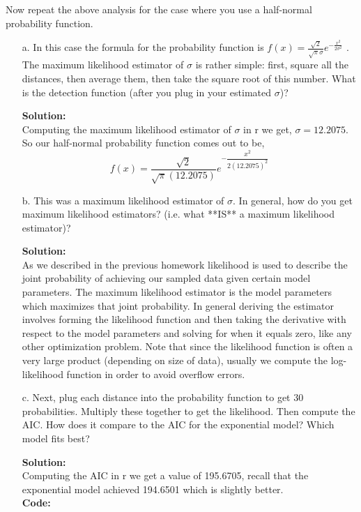 \documentclass[12pt]{article}
\makeatletter
\theoremstyle{homework}
\newenvironment{exercise}[1]
{\def\@currentlabel{#1}\exercisecore}
{\endexercisecore}
\newcommand{\localhead}[1]{\par\smallskip\noindent\textbf{#1}\nobreak\\}%
\newcommand\solution{\localhead{Solution:}}
\makeatother
\begin{document}
\begin{exercise}{2} Now repeat the above analysis for the case where you use a half-normal probability
  function.\\

  \begin{enumerate}
    \item[a.] In this case the formula for the probability function is $f(x) = \frac{\sqrt{2}}{\sqrt{\pi}\sigma} e^{-\frac{x^2}{2\sigma^2}}$ .  
    The maximum likelihood estimator of $\sigma$ is rather simple: first, square all the distances, then average them, 
    then take the square root of this number. What is the detection function (after you plug in your estimated $\sigma$)?\\
    \solution Computing the maximum likelihood estimator of $\sigma$ in r we get, $\sigma = 12.2075$. So our half-normal probability function 
    comes out to be, 
    \begin{equation*}
      f(x) =  \dfrac{\sqrt{2}}{\sqrt{\pi}(12.2075)} e^{-\dfrac{x^2}{2(12.2075)^2}}
    \end{equation*}
    \vspace{.15in}


    \item[b.] This was a maximum likelihood estimator of $\sigma$. In general, how do you get maximum likelihood estimators?  (i.e. what **IS** a maximum likelihood estimator)?\\
    \solution As we described in the previous homework likelihood is used to describe the joint probability of achieving our sampled data given 
    certain model parameters. The maximum likelihood estimator is the model parameters which maximizes that joint probability. In general deriving the estimator 
    involves forming the likelihood function and then taking the derivative with respect to the model parameters and solving for when it equals zero, like any other optimization problem.
    Note that since the likelihood function is often a very large product (depending on size of data), usually we compute the log-likelihood function in order to avoid overflow errors. 
    \vspace{.15in}


    \item[c. ] Next, plug each distance into the probability function to get 30 probabilities. Multiply
    these together to get the likelihood. Then compute the AIC. How does it  compare to the AIC for the exponential model? Which model fits best?\\
    \solution  Computing the AIC in r we get a value of 195.6705, recall that the exponential model achieved 194.6501 which is slightly better. \\
    \textbf{Code:}
    \begin{center}
       
    \end{center}
    

\end{enumerate}
\end{exercise}
\end{document}
